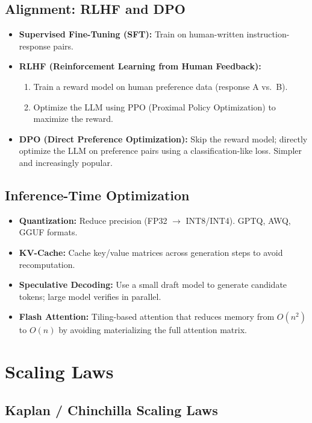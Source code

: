 \documentclass[11pt,a4paper]{article}
\begin{document}
\subsection{Alignment: RLHF and DPO}
\begin{itemize}[nosep]
  \item \textbf{Supervised Fine-Tuning (SFT):} Train on human-written instruction-response pairs.
  \item \textbf{RLHF (Reinforcement Learning from Human Feedback):}
    \begin{enumerate}[nosep]
      \item Train a reward model on human preference data (response A vs.\ B).
      \item Optimize the LLM using PPO (Proximal Policy Optimization) to maximize the reward.
    \end{enumerate}
  \item \textbf{DPO (Direct Preference Optimization):} Skip the reward model; directly optimize the LLM on preference pairs using a classification-like loss. Simpler and increasingly popular.
\end{itemize}

\subsection{Inference-Time Optimization}
\begin{itemize}[nosep]
  \item \textbf{Quantization:} Reduce precision (FP32 $\to$ INT8/INT4). GPTQ, AWQ, GGUF formats.
  \item \textbf{KV-Cache:} Cache key/value matrices across generation steps to avoid recomputation.
  \item \textbf{Speculative Decoding:} Use a small draft model to generate candidate tokens; large model verifies in parallel.
  \item \textbf{Flash Attention:} Tiling-based attention that reduces memory from $O(n^2)$ to $O(n)$ by avoiding materializing the full attention matrix.
\end{itemize}

\section{Scaling Laws}

\subsection{Kaplan / Chinchilla Scaling Laws}
\end{document}
